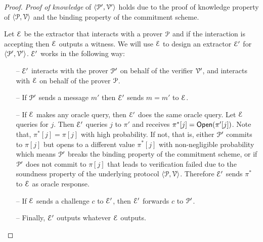 \begin{proof}
	\textit{Proof of knowledge} of $\langle \mathcal{P}', \mathcal{V}' \rangle$ holds due to the proof of knowledge property of $\langle \mathcal{P}, \mathcal{V} \rangle$ and the binding property of the commitment scheme. 
	
	Let $\mathcal{E}$ be the extractor that interacts with a prover $\mathcal{P}$ and if the interaction is accepting then $\mathcal{E}$ outputs a witness. We will use $\mathcal{E}$ to design an extractor $\mathcal{E}'$ for $\langle \mathcal{P}', \mathcal{V}' \rangle$. $\mathcal{E}'$ works in the following way:
	\begin{itemize}
		\item[--] $\mathcal{E}'$ interacts with the prover $\mathcal{P}'$ on behalf of the verifier $\mathcal{V}'$, and interacts with $\mathcal{E}$ on behalf of the prover $\mathcal{P}$.
		\item[--] If $\mathcal{P}'$ sends a message $m'$ then $\mathcal{E}'$ sends $m=m'$ to $\mathcal{E}$. 
		\item[--] If $\mathcal{E}$ makes any oracle query, then $\mathcal{E}'$ does the same oracle query. Let $\mathcal{E}$ queries for $j$. Then $\mathcal{E}'$ queries $j$ to $\pi'$ and receives $\pi^\ast[j] = \mathsf{Open}(\pi'[j])$. 
		Note that, $\pi^\ast[j] = \pi[j]$ with high probability. If not, that is, either $\mathcal{P}'$ commits to $\pi[j]$ but opens to a different value $\pi^\ast[j]$ with non-negligible probability which means $\mathcal{P}'$ breaks the binding property of the commitment scheme, or if $\mathcal{P}'$ does not commit to $\pi[j]$ that leads to verification failed due to the soundness property of the underlying protocol $\langle \mathcal{P}, \mathcal{V} \rangle$.
		Therefore $\mathcal{E}'$ sends $\pi^\ast$ to $\mathcal{E}$ as oracle response.
		\item[--] If $\mathcal{E}$ sends a challenge $c$ to $\mathcal{E}'$, then $\mathcal{E}'$ forwards $c$ to $\mathcal{P}'$.
		\item[--] Finally, $\mathcal{E}'$ outputs whatever $\mathcal{E}$ outputs. 
	\end{itemize}
%	
	

\end{proof}
